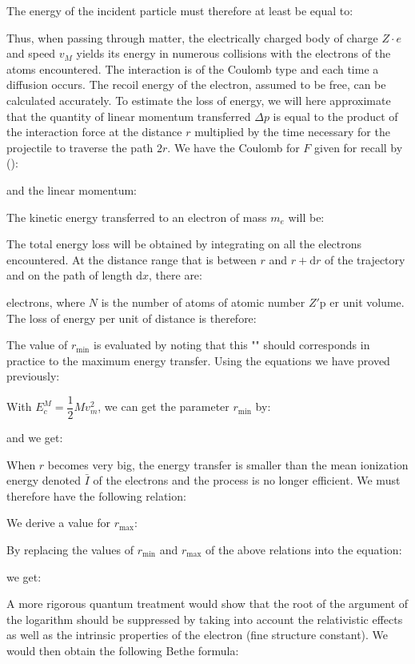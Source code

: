 	The energy of the incident particle must therefore at least be equal to:
	
	Thus, when passing through matter, the electrically charged body of charge $Z\cdot e$ and speed $v_M$ yields its energy in numerous collisions with the electrons of the atoms encountered. The interaction is of the Coulomb type and each time a diffusion occurs. The recoil energy of the electron, assumed to be free, can be calculated accurately. To estimate the loss of energy, we will here approximate that the quantity of linear momentum transferred $\Delta p$ is equal to the product of the interaction force at the distance $r$ multiplied by the time necessary for the projectile to traverse the path $2r$. We have the Coulomb for $F$ given for recall by ():
	
	and the linear momentum:
	
	The kinetic energy transferred to an electron of mass $m_e$ will be:
	
	The total energy loss will be obtained by integrating on all the electrons encountered. At the distance range that is between $r$ and $r + \mathrm{d}r$ of the trajectory and on the path of length $\mathrm{d}x$, there are:
	
	electrons, where $N$ is the number of atoms of atomic number $Z'$p er unit volume. The loss of energy per unit of distance is therefore:
	
	The value of $r_{\min}$ is evaluated by noting that this "" should corresponds in practice to the maximum energy transfer. Using the equations we have proved previously:
	
	With $E_c^M=\dfrac{1}{2}Mv_m^2$, we can get the parameter $r_{\min}$ by:
	
	and we get:
	
	When $r$ becomes very big, the energy transfer is smaller than the mean ionization energy denoted $\bar{I}$ of the electrons and the process is no longer efficient. We must therefore have the following relation:
	
	We derive a value for $r_\text{max}$:
	
	By replacing the values of $r_{\min}$ and $r_{\max}$ of the above relations into the equation:
	
	we get:
	
	A more rigorous quantum treatment would show that the root of the argument of the logarithm should be suppressed by taking into account the relativistic effects as well as the intrinsic properties of the electron (fine structure constant). We would then obtain the following Bethe formula:
	
